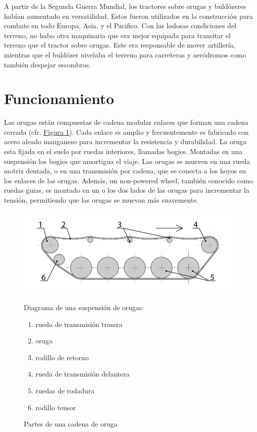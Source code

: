 A partir de la Segunda Guerra Mundial, los tractores sobre orugas y
buldózeres habían aumentado en versatilidad. Estos fueron utilizados
en la construcción para combate en todo Europa, Asia, y el
Pacifico. Con las lodosas condiciones del terreno, no hubo otra
maquinaria que era mejor equipada para transitar el terreno que el
tractor sobre orugas. Este era responsable de mover artillería,
mientras que el buldózer nivelaba el terreno para carreteras y
aeródromos como también despejar escombros.

\section{Funcionamiento}

Las orugas están compuestas de cadena modular enlaces que forman una
cadena cerrada (cfr. \hyperref[fig:cadena]{Figura
  \ref*{fig:cadena}}). Cada enlace es amplio y frecuentemente es
fabricado con acero aleado manganeso para incrementar la resistencia y
durabilidad. La oruga esta fijada en el suelo por ruedas interiores,
llamadas bogies. Montadas en una suspensión los bogies que amortigua
el viaje. Las orugas se mueven en una rueda motriz dentada, o en una
transmisión por cadena, que se conecta a los hoyos en los enlaces de
las orugas. Además, un non-powered wheel, también conocido como ruedas
guias, es montado en un o los dos lados de las orugas para incrementar
la tensión, permitiendo que las orugas se muevan más suavemente.

\begin{figure}[!hbp]
  \centering
  \begin{minipage}{0.4\textwidth}
    \includegraphics[width=1.5\textwidth]{oruga_03.png}
  \end{minipage}
  \hfill
  \begin{minipage}{0.4\textwidth}
   Diagrama de una suspensión de orugas:
   \begin{enumerate}
   \item rueda de transmisión trasera
   \item oruga 
   \item rodillo de retorno
   \item rueda de transmisión delantera
   \item ruedas de rodadura
   \item rodillo tensor
   \end{enumerate}
  \end{minipage}
  \caption{\label{fig:cadena} Partes de una cadena de oruga}
\end{figure}

